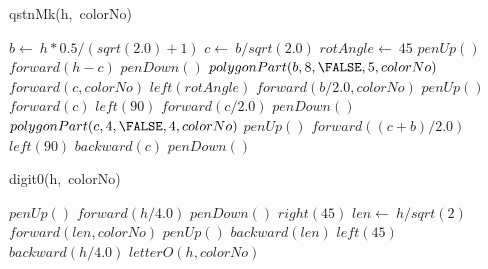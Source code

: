 \documentclass[a4paper,10pt]{article}
\begin{document}
\begin{algorithm}
\caption{qstnMk(h,\ colorNo)}
\begin{algorithmic}[5]

\STATE {}
\STATE {}
  \STATE \(b\gets\ h*0.5/(sqrt(2.0)+1)\)
  \STATE \(c\gets\ b/sqrt(2.0)\)
  \STATE \(rotAngle\gets\ 45\)
  \STATE \(penUp()\)
  \STATE \(forward(h-c)\)
  \STATE \(penDown()\)
  \STATE {}
  \STATE {}
  \STATE \(polygonPart(b,8,\FALSE,5,colorNo)\)
  \STATE \(forward(c,colorNo)\)
  \STATE \(left(rotAngle)\)
  \STATE \(forward(b/2.0,colorNo)\)
  \STATE \(penUp()\)
  \STATE \(forward(c)\)
  \STATE \(left(90)\)
  \STATE \(forward(c/2.0)\)
  \STATE \(penDown()\)
  \STATE {}
  \STATE {}
  \STATE \(polygonPart(c,4,\FALSE,4,colorNo)\)
  \STATE \(penUp()\)
  \STATE \(forward((c+b)/2.0)\)
  \STATE \(left(90)\)
  \STATE \(backward(c)\)
  \STATE \(penDown()\)

\end{algorithmic}
\end{algorithm}


\begin{algorithm}
\caption{digit0(h,\ colorNo)}
\begin{algorithmic}[5]

\STATE {}
\STATE {}
  \STATE \(penUp()\)
  \STATE \(forward(h/4.0)\)
  \STATE \(penDown()\)
  \STATE \(right(45)\)
  \STATE \(len\gets\ h/sqrt(2)\)
  \STATE \(forward(len,colorNo)\)
  \STATE \(penUp()\)
  \STATE \(backward(len)\)
  \STATE \(left(45)\)
  \STATE \(backward(h/4.0)\)
  \STATE \(letterO(h,colorNo)\)

\end{algorithmic}
\end{algorithm}
\end{document}
